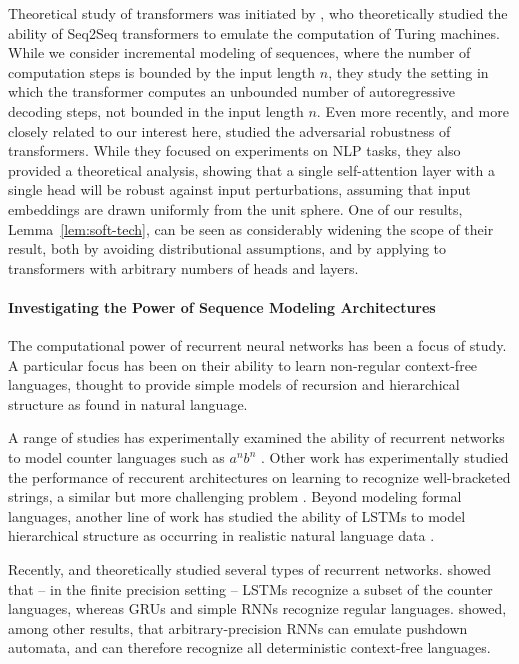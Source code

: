 \documentclass[11pt,a4paper]{article}
\begin{document}
Theoretical study of transformers was initiated by \citet{perez2019turing}, who theoretically studied the ability of Seq2Seq transformers to emulate the computation of Turing machines.
While we consider incremental modeling of sequences, where the number of computation steps is bounded by the input length $n$, they study the setting in which the transformer computes an unbounded number of autoregressive decoding steps, not bounded in the input length $n$.
Even more recently, and more closely related to our interest here, \citet{hsieh2019robustness} studied the adversarial robustness of transformers.
While they focused on experiments on NLP tasks, they also provided a theoretical analysis, showing that a single self-attention layer with a single head will be robust against input perturbations, assuming that input embeddings are drawn uniformly from the unit sphere.
One of our results, Lemma~\ref{lem:soft-tech}, can be seen as considerably widening the scope of their result, both by avoiding distributional assumptions, and by applying to transformers with arbitrary numbers of heads and layers.


\paragraph{Investigating the Power of Sequence Modeling Architectures}
The computational power of recurrent neural networks has been a focus of study.
A particular focus has been on their ability to learn non-regular context-free languages, thought to provide simple models of recursion and hierarchical structure as found in natural language.

A range of studies has experimentally examined the ability of recurrent networks to model counter languages such as $a^nb^n$ \cite{kalinke1998computation,gers2001lstm,cartling2008implicit,weiss2018practical,suzgun2019evaluating}.
Other work has experimentally studied the performance of reccurent architectures on learning to recognize well-bracketed strings, a similar but more challenging problem \cite{sennhauser2018evaluating,skachkova2018closing,bernardy2018can}.
Beyond modeling formal languages, another line of work has studied the ability of LSTMs to model hierarchical structure as occurring in realistic natural language data \cite{linzen2016assessing,gulordava2018colorless}.

Recently, \citet{merrill2019sequential} and \citet{korsky2019computational} theoretically studied several types of recurrent networks. \citet{merrill2019sequential} showed that -- in the finite precision setting -- LSTMs recognize a subset of the counter languages, whereas GRUs and simple RNNs recognize regular languages.
\citet{korsky2019computational} showed, among other results, that arbitrary-precision RNNs can emulate pushdown automata, and can therefore recognize all deterministic context-free languages.
\end{document}
